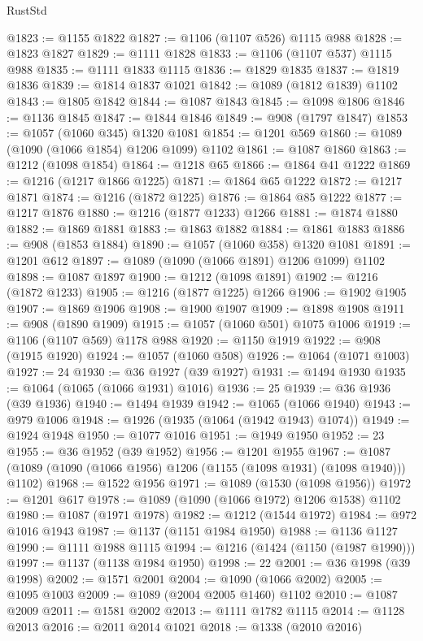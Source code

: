 \begin{lexlean}{RustStd}
\begin{coremodule}
@1823 := @1155 @1822
@1827 := @1106 (@1107 @526) @1115 @988
@1828 := @1823 @1827
@1829 := @1111 @1828
@1833 := @1106 (@1107 @537) @1115 @988
@1835 := @1111 @1833 @1115
@1836 := @1829 @1835
@1837 := @1819 @1836
@1839 := @1814 @1837 @1021
@1842 := @1089 (@1812 @1839) @1102
@1843 := @1805 @1842
@1844 := @1087 @1843
@1845 := @1098 @1806
@1846 := @1136 @1845
@1847 := @1844 @1846
@1849 := @908 (@1797 @1847)
@1853 := @1057 (@1060 @345) @1320 @1081
@1854 := @1201 @569
@1860 := @1089 (@1090 (@1066 @1854) @1206 @1099) @1102
@1861 := @1087 @1860
@1863 := @1212 (@1098 @1854)
@1864 := @1218 @65
@1866 := @1864 @41 @1222
@1869 := @1216 (@1217 @1866 @1225)
@1871 := @1864 @65 @1222
@1872 := @1217 @1871
@1874 := @1216 (@1872 @1225)
@1876 := @1864 @85 @1222
@1877 := @1217 @1876
@1880 := @1216 (@1877 @1233) @1266
@1881 := @1874 @1880
@1882 := @1869 @1881
@1883 := @1863 @1882
@1884 := @1861 @1883
@1886 := @908 (@1853 @1884)
@1890 := @1057 (@1060 @358) @1320 @1081
@1891 := @1201 @612
@1897 := @1089 (@1090 (@1066 @1891) @1206 @1099) @1102
@1898 := @1087 @1897
@1900 := @1212 (@1098 @1891)
@1902 := @1216 (@1872 @1233)
@1905 := @1216 (@1877 @1225) @1266
@1906 := @1902 @1905
@1907 := @1869 @1906
@1908 := @1900 @1907
@1909 := @1898 @1908
@1911 := @908 (@1890 @1909)
@1915 := @1057 (@1060 @501) @1075 @1006
@1919 := @1106 (@1107 @569) @1178 @988
@1920 := @1150 @1919
@1922 := @908 (@1915 @1920)
@1924 := @1057 (@1060 @508)
@1926 := @1064 (@1071 @1003)
@1927 := 24
@1930 := @36 @1927 (@39 @1927)
@1931 := @1494 @1930
@1935 := @1064 (@1065 (@1066 @1931) @1016)
@1936 := 25
@1939 := @36 @1936 (@39 @1936)
@1940 := @1494 @1939
@1942 := @1065 (@1066 @1940)
@1943 := @979 @1006
@1948 := @1926 (@1935 (@1064 (@1942 @1943) @1074))
@1949 := @1924 @1948
@1950 := @1077 @1016
@1951 := @1949 @1950
@1952 := 23
@1955 := @36 @1952 (@39 @1952)
@1956 := @1201 @1955
@1967 := @1087 (@1089 (@1090 (@1066 @1956) @1206 (@1155 (@1098 @1931) (@1098 @1940))) @1102)
@1968 := @1522 @1956
@1971 := @1089 (@1530 (@1098 @1956))
@1972 := @1201 @617
@1978 := @1089 (@1090 (@1066 @1972) @1206 @1538) @1102
@1980 := @1087 (@1971 @1978)
@1982 := @1212 (@1544 @1972)
@1984 := @972 @1016 @1943
@1987 := @1137 (@1151 @1984 @1950)
@1988 := @1136 @1127
@1990 := @1111 @1988 @1115
@1994 := @1216 (@1424 (@1150 (@1987 @1990)))
@1997 := @1137 (@1138 @1984 @1950)
@1998 := 22
@2001 := @36 @1998 (@39 @1998)
@2002 := @1571 @2001
@2004 := @1090 (@1066 @2002)
@2005 := @1095 @1003
@2009 := @1089 (@2004 @2005 @1460) @1102
@2010 := @1087 @2009
@2011 := @1581 @2002
@2013 := @1111 @1782 @1115
@2014 := @1128 @2013
@2016 := @2011 @2014 @1021
@2018 := @1338 (@2010 @2016)

\end{coremodule}
\end{lexlean}
